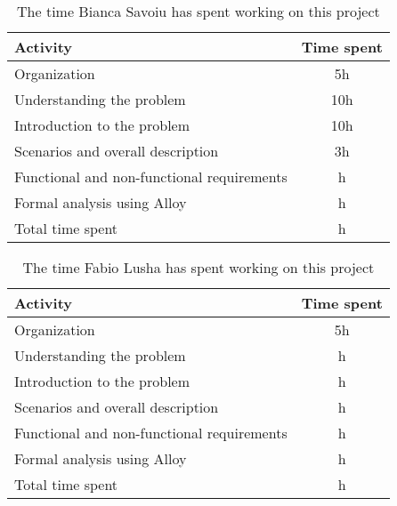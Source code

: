 \label{sec:Effort spent}%
\begin{table}[h!]
    \centering
    \begin{tabular}{|l|c|}
     \hline
     \textbf{Activity} & \textbf{Time spent} \\
    \hline
    Organization & 5h \\
    \hline
    Understanding the problem & 10h \\
    \hline
    Introduction to the problem & 10h \\
    \hline
    Scenarios and overall description & 3h \\
    \hline
    Functional and non-functional requirements & h \\
    \hline
    Formal analysis using Alloy & h \\
    \hline
    Total time spent & h \\
    \hline
\end{tabular}
    \caption{The time Bianca Savoiu has spent working on this project}
    \label{tab:Assumptions}
\end{table}


\begin{table}[h!]
    \centering
    \begin{tabular}{|l|c|}
    \hline
     \textbf{Activity} & \textbf{Time spent} \\
    \hline
    Organization & 5h \\
    \hline
    Understanding the problem & h \\
    \hline
    Introduction to the problem & h \\
    \hline
    Scenarios and overall description & h \\
    \hline
    Functional and non-functional requirements & h \\
    \hline
    Formal analysis using Alloy & h \\
    \hline
    Total time spent & h \\
    \hline
\end{tabular}
    \caption{The time Fabio Lusha has spent working on this project}
    \label{tab:Assumptions}
\end{table}